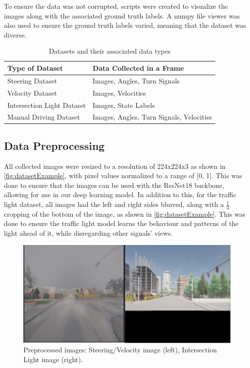 \documentclass{article} %
\begin{document}
To ensure the data was not corrupted, scripts were created to visualize the images along with the associated ground truth labels. A numpy file viewer was also used to ensure the ground truth labels varied, meaning that the dataset was diverse.

\begin{table}[h]
\centering
\caption{Datasets and their associated data types}
\vspace{0.5em}
\begin{tabular}{|p{5cm}|p{7cm}|}
\hline
\textbf{Type of Dataset} & \textbf{Data Collected in a Frame} \\ \hline
Steering Dataset & Images, Angles, Turn Signals \\ \hline
Velocity Dataset & Images, Velocities \\ \hline
Intersection Light Dataset & Images, State Labels \\ \hline
Manual Driving Dataset & Images, Angles, Turn Signals, Velocities \\ \hline
\end{tabular}
\end{table}


\subsection{Data Preprocessing}

All collected images were resized to a resolution of 224x224x3 as shown in \autoref{fig:datasetExample}, with pixel values normalized to a range of [0, 1].
This was done to ensure that the images can be used with the ResNet18 backbone, allowing for use in our deep learning model. In addition to this, for the traffic light dataset, all images had the left and right sides blurred, along with a \(\frac{1}{3}\) cropping of the bottom of the image, as shown in \autoref{fig:datasetExample}. This was done to ensure the traffic light model learns the behaviour and patterns of the light ahead of it, while disregarding other signals' views.

\begin{figure}[H] %
    \centering
    \includegraphics[width=1.0\textwidth]{example of images in dataset.png} %
    \caption{Preprocessed images: Steering/Velocity image (left), Intersection Light image (right).}
    \label{fig:datasetExample}
\end{figure}
\end{document}
